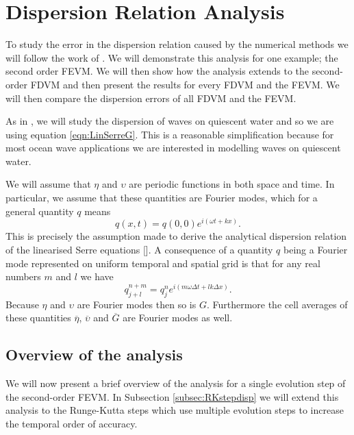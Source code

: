 \section{Dispersion Relation Analysis}
To study the error in the dispersion relation caused by the numerical methods we will follow the work of \cite{Filippini-etal-2016-381}. We will demonstrate this analysis for one example; the second order FEVM. We will then show how the analysis extends to the second-order FDVM and then present the results for every FDVM and the FEVM. We will then compare the dispersion errors of all FDVM and the FEVM.

As in \cite{Filippini-etal-2016-381}, we will study the dispersion of waves on quiescent water and so we are using equation \eqref{eqn:LinSerreG}. This is a reasonable simplification because for most ocean wave applications we are interested in modelling waves on quiescent water.

We will assume that $\eta$ and $\upsilon$ are periodic functions in both space and time. In particular, we assume that these quantities are Fourier modes, which for a general quantity $q$ means
\begin{equation}
q(x,t) = q(0,0) e^{i\left(\omega t + kx\right)}.
\label{eqn:FourierNode}
\end{equation}
This is precisely the assumption made to derive the analytical dispersion relation of the linearised Serre equations []. A consequence of a quantity $q$ being a Fourier mode represented on uniform temporal and spatial grid is that for any real numbers $m$ and $l$ we have
\begin{equation}
q^{n + m}_{j + l} = q^n_j e^{ i \left(m \omega \Delta t + l k \Delta x\right)}.
\label{eqn:fourierfactor}
\end{equation}
Because $\eta$ and $\upsilon$ are Fourier modes then so is $G$. Furthermore the cell averages of these quantities $\overline{\eta}$, $\overline{\upsilon}$ and $\overline{G}$ are Fourier modes as well.

\subsection{Overview of the analysis}
We will now present a brief overview of the analysis for a single evolution step of the second-order FEVM. In Subsection \ref{subsec:RKstepdisp} we will extend this analysis to the Runge-Kutta steps which use multiple evolution steps to increase the temporal order of accuracy.

